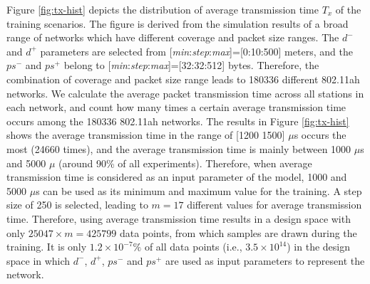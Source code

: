 Figure \ref{fig:tx-hist} depicts the distribution of average transmission time $T_x$ of the training scenarios. The figure is derived from the simulation results of a broad range of networks which have different coverage and packet size ranges. The $d^-$ and $d^+$ parameters are selected from [\textit{min}:\textit{step}:\textit{max}]=[0:10:500] meters, and the $ps^-$ and $ps^+$ belong to  [\textit{min}:\textit{step}:\textit{max}]=[32:32:512] bytes. Therefore, the combination of coverage and packet size range leads to 180336 different 802.11ah networks. We calculate the average packet transmission time across all stations in each network, and count how many times a certain average transmission time occurs among the 180336 802.11ah networks. The results in Figure \ref{fig:tx-hist} shows the average transmission time in the range of [1200 1500] $\mu$s occurs the most (24660 times),  and the average transmission time is mainly between 1000 $\mu$s and 5000 $\mu$ (around 90\% of all experiments). Therefore,  when average transmission time is considered as an input parameter of the model, 1000 and 5000 $\mu$s can be used as its minimum and maximum value for the training. A step size of 250 is selected, leading to $m = 17$ different values for average transmission time.
Therefore, using average transmission time results in a design space with only $25047 \times m = 425799$ data points, from which samples are drawn during the training.
It is only $1.2 \times 10^{-7} \%$ of all data points (i.e., $3.5 \times 10^{14}$) in the design space in which $d^-$, $d^+$, $ps^-$ and $ps^+$ are used as input parameters to represent the network.



 


